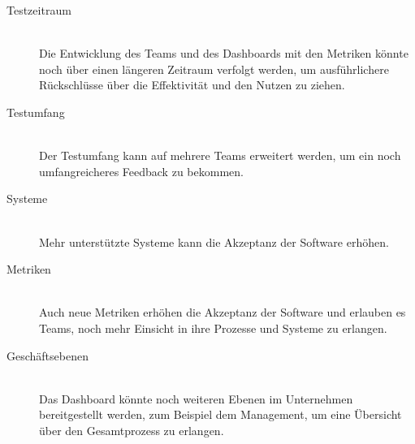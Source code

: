 \begin{description}
    \item[Testzeitraum] \hfill \\ Die Entwicklung des Teams und des Dashboards mit den Metriken könnte noch über einen längeren Zeitraum verfolgt werden, um ausführlichere Rückschlüsse über die Effektivität und den Nutzen zu ziehen.
    \item[Testumfang] \hfill \\ Der Testumfang kann auf mehrere Teams erweitert werden, um ein noch umfangreicheres Feedback zu bekommen.
    \item[Systeme] \hfill \\ Mehr unterstützte Systeme kann die Akzeptanz der Software erhöhen.
    \item[Metriken] \hfill \\ Auch neue Metriken erhöhen die Akzeptanz der Software und erlauben es Teams, noch mehr Einsicht in ihre Prozesse und Systeme zu erlangen.
    \item[Geschäftsebenen] \hfill \\ Das Dashboard könnte noch weiteren Ebenen im Unternehmen bereitgestellt werden, zum Beispiel dem Management, um eine Übersicht über den Gesamtprozess zu erlangen.
\end{description}
